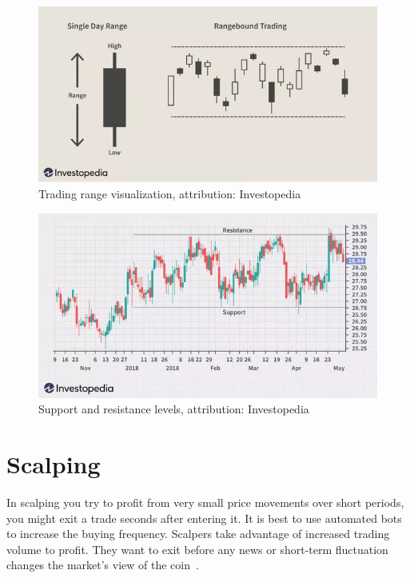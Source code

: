 \begin{figure}[!hbt]
    \centering
    \includegraphics[width=\columnwidth]{figures/trading-range.png}
    \caption{Trading range visualization, attribution: Investopedia~\cite{investopedia:trading-range}}
    \label{trading-range-figure}
\end{figure}

\begin{figure}[!hbt]
    \centering
    \includegraphics[width=\columnwidth]{figures/dotdash-final-trading-range.png}
    \caption{Support and resistance levels, attribution: Investopedia~\cite{investopedia:trading-range}}
    \label{sup-and-res-levels}
\end{figure}

\section{Scalping}
In scalping you try to profit from very small price movements over short periods, you might exit a trade seconds after entering it. It is best to use automated bots to increase the buying frequency. Scalpers take advantage of increased trading volume to profit. They want to exit before any news or short-term fluctuation changes the market's view of the coin~\cite{best-crypto-daytrading}.

